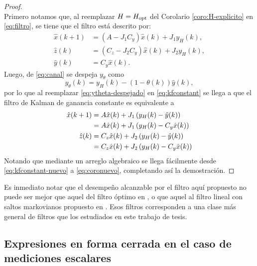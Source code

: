 \begin{proof}{\ \\}
Primero notamos que, al reemplazar $H=H_{\operatorname{opt}}$ del Corolario \ref{coro:H-explicito} en \eqref{eq:filtro}, se tiene que el filtro está descrito por:
\begin{subequations}\label{eq:coronuevo}
\begin{align}
\hat{x}(k+1)&=\left(A-J_1C_y\right)\hat{x}(k)+J_1y_{H}(k),\\
\hat{z}(k)&=\left(C_z-J_2C_y\right)\hat{x}(k)+J_2y_{H}(k),\\
\hat{y}(k)&=C_y\hat{x}(k).
\end{align}
\end{subequations}
Luego, de \eqref{eq:canal} se despeja $y_{\theta}$ como
\begin{equation}\label{eq:ytheta-despejado}
y_{\theta}(k)=y_H(k)-\left(1-\theta(k)\right)\hat{y}(k),
\end{equation}
por lo que al reemplazar \eqref{eq:ytheta-despejado} en \eqref{eq:kfconstant} se llega a que el filtro de Kalman de ganancia constante es equivalente a\newpage
\begin{subequations}\label{eq:kfconstant-nuevo}
\begin{align}
\nonumber
\hat{x}(k+1)&=A\hat{x}(k)+J_1\left(y_H(k)-\hat{y}(k)\right)\\
&=A\hat{x}(k)+J_1\left(y_H(k)-C_y\hat{x}(k)\right)\\
\nonumber
\hat{z}(k)&=C_z\hat{x}(k)+J_2\left(y_H(k)-\hat{y}(k)\right)\\
&=C_z\hat{x}(k)+J_2\left(y_H(k)-C_y\hat{x}(k)\right)
\end{align}
\end{subequations}
Notando que mediante un arreglo algebraico se llega f\'acilmente desde \eqref{eq:kfconstant-nuevo} a \eqref{eq:coronuevo}, completando as\'i la demostraci\'on.
\QED
\end{proof}

Es inmediato notar que el desempe\~no alcanzable por el filtro aqu\'i propuesto no puede ser mejor que aquel del filtro \'optimo en \cite{siscfr04}, o que aquel al filtro lineal con saltos markovianos propuesto en \cite{cofrma05}. Esos filtros corresponden a una clase m\'as general de filtros que los estudiados en este trabajo de tesis.

\subsection{Expresiones en forma cerrada en el caso de mediciones escalares}\label{subsec:closed_form_mimo}

